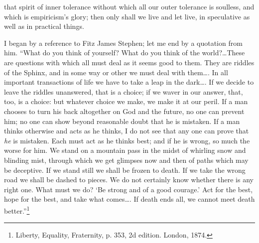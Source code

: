 \documentclass[12pt]{article}
\begin{document}
that spirit of inner tolerance without which all our outer tolerance is soulless, and which is empiricism's glory; then only shall we live and let live, in speculative as well as in practical things.

I began by a reference to Fitz James Stephen; let me end by a quotation from him.  ``What do you think  of yourself?  What do you think of the world?\ldots  These are questions with which all must deal as it seems good to them.  They are riddles of the Sphinx, and in some way or other we must deal with them\ldots.  In all important transactions of life we have to take a leap in the dark\ldots.  If we decide to leave the riddles unanswered, that is a choice; if we waver in our answer, that, too, is a choice: but whatever choice we make, we make it at our peril.  If a man chooses to turn his back altogether on God and the future, no one can prevent him; no one can show beyond reasonable doubt that he is mistaken.  If a man thinks otherwise and acts as he thinks, I do not see that any one can prove that \emph{he} is mistaken.  Each must act as he thinks best; and if he is wrong, so much the worse for him.  We stand on a mountain pass in the midst of whirling snow and blinding mist, through which we get glimpses now and then of paths which may be deceptive.  If we stand still we shall be frozen to death.  If we take the wrong road we shall be dashed to pieces.  We do not certainly know whether there is any right one.  What must we do?  `Be strong and of a good courage.'  Act for the best, hope for the best, and take what comes\ldots.  If death ends all, we cannot meet death better.''\footnote{Liberty, Equality, Fraternity, p. 353, 2d edition.  London, 1874.}

 
\end{document}
